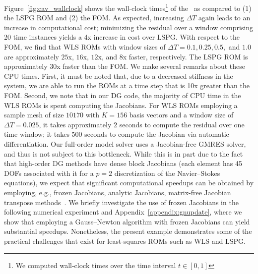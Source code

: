 Figure~\ref{fig:cav_wallclock}
shows the wall-clock times\footnote{We computed wall-clock times over the time interval $t \in [0,1]$} of the \methodAcronymROMs\ as compared to (1) the LSPG ROM and (2) the FOM.  As expected, increasing $\Delta T$ again leads to an increase in computational cost; minimizing the residual over a window comprising 20 time instances yields a 4x increase in cost over LSPG. With respect to the FOM, we find that WLS ROMs with window sizes of $\Delta T = 0.1, 0.25, 0.5,$  and $1.0$ are approximately $25$x, $16$x, $12$x, and $8$x faster, respectively. The LSPG ROM is approximately 30x faster than the FOM.  We make several remarks about these CPU times. First, it must be noted that, due to a decreased stiffness in the system, we are able to run the ROMs at a time step that is 10x greater than the FOM. Second, we note that in our DG code, the majority of CPU time in the WLS ROMs is spent computing the Jacobians. For WLS ROMs employing a sample mesh of size $10170$ with $K=156$ basis vectors and a window size of $\Delta T = 0.025$, it takes approximately $2$ seconds to compute the residual over one time window; it takes $500$ seconds to compute the Jacobian via automatic differentiation. Our full-order model solver uses a Jacobian-free GMRES solver, and thus is not subject to this bottleneck. While this is in part due to the fact that high-order DG methods have dense block Jacobians (each element has 45 DOFs associated with it for a $p=2$ discretization of the Navier--Stokes equations), we expect that significant computational speedups can be obtained by employing, e.g., frozen Jacobians, analytic Jacobians, matrix-free Jacobian transpose methods~\cite{doi:10.2514/6.2016-0833}. We briefly investigate the use of frozen Jacobians in the following numerical experiment and Appendix~\ref{appendix:gnupdate}, where we show that employing a Gauss--Newton algorithm with frozen Jacobians can yield substantial speedups. Nonetheless, the present example demonstrates some of the practical challenges that exist for least-squares ROMs such as WLS and LSPG. 

